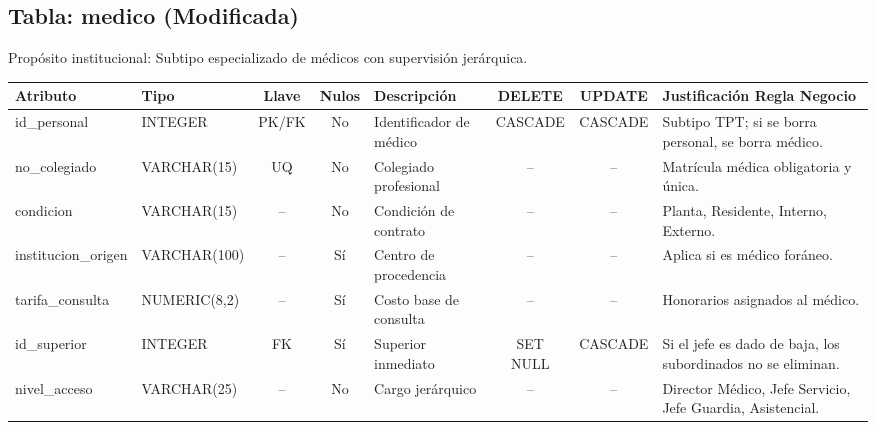 \documentclass[11pt,a4paper]{article}
\begin{document}
\subsection{Tabla: medico (Modificada)}
Propósito institucional: Subtipo especializado de médicos con supervisión jerárquica.
\begin{table}[H]
\centering
\scriptsize
\begin{tabularx}{\linewidth}{|l|l|c|c|X|c|c|X|}
\hline
\textbf{Atributo} & \textbf{Tipo} & \textbf{Llave} & \textbf{Nulos} & \textbf{Descripción} & \textbf{DELETE} & \textbf{UPDATE} & \textbf{Justificación Regla Negocio} \\
\hline
id\_personal & INTEGER & PK/FK & No & Identificador de médico & CASCADE & CASCADE & Subtipo TPT; si se borra personal, se borra médico. \\
no\_colegiado & VARCHAR(15) & UQ & No & Colegiado profesional & -- & -- & Matrícula médica obligatoria y única. \\
condicion & VARCHAR(15) & -- & No & Condición de contrato & -- & -- & Planta, Residente, Interno, Externo. \\
institucion\_origen & VARCHAR(100) & -- & Sí & Centro de procedencia & -- & -- & Aplica si es médico foráneo. \\
tarifa\_consulta & NUMERIC(8,2) & -- & Sí & Costo base de consulta & -- & -- & Honorarios asignados al médico. \\
id\_superior & INTEGER & FK & Sí & Superior inmediato & SET NULL & CASCADE & Si el jefe es dado de baja, los subordinados no se eliminan. \\
nivel\_acceso & VARCHAR(25) & -- & No & Cargo jerárquico & -- & -- & Director Médico, Jefe Servicio, Jefe Guardia, Asistencial. \\
\hline
\end{tabularx}
\end{table}
\end{document}

